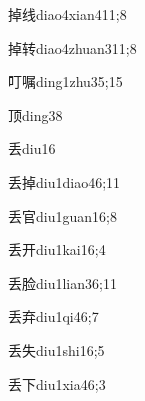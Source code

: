\begin{verbete}{掉线}{diao4xian4}{11;8}
\end{verbete}

\begin{verbete}{掉转}{diao4zhuan3}{11;8}
\end{verbete}

\begin{verbete}{叮嘱}{ding1zhu3}{5;15}
\end{verbete}

\begin{verbete}{顶}{ding3}{8}
\end{verbete}

\begin{verbete}{丢}{diu1}{6}
\end{verbete}

\begin{verbete}{丢掉}{diu1diao4}{6;11}
\end{verbete}

\begin{verbete}{丢官}{diu1guan1}{6;8}
\end{verbete}

\begin{verbete}{丢开}{diu1kai1}{6;4}
\end{verbete}

\begin{verbete}{丢脸}{diu1lian3}{6;11}
\end{verbete}

\begin{verbete}{丢弃}{diu1qi4}{6;7}
\end{verbete}

\begin{verbete}{丢失}{diu1shi1}{6;5}
\end{verbete}

\begin{verbete}{丢下}{diu1xia4}{6;3}
\end{verbete}

